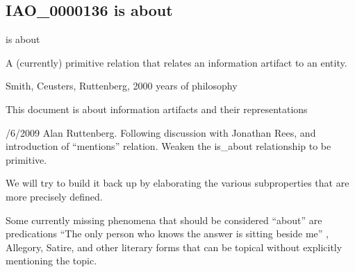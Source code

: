 \documentclass[letterpaper,10pt,english]{sphinxmanual}
\begin{document}
\subsection{IAO\_0000136 \sphinxhyphen{} is about}
\label{\detokenize{doc-IAO_0000136:iao-0000136-is-about}}\label{\detokenize{doc-IAO_0000136:index-0}}\label{\detokenize{doc-IAO_0000136::doc}}
\begin{sphinxShadowBox}

\sphinxAtStartPar
is about
\end{sphinxShadowBox}

\begin{sphinxShadowBox}

\sphinxAtStartPar
{}
\end{sphinxShadowBox}

\begin{sphinxShadowBox}

\sphinxAtStartPar
A (currently) primitive relation that relates an information artifact to an entity.
\end{sphinxShadowBox}

\begin{sphinxShadowBox}

\sphinxAtStartPar
Smith, Ceusters, Ruttenberg, 2000 years of philosophy
\end{sphinxShadowBox}

\begin{sphinxShadowBox}

\sphinxAtStartPar
This document is about information artifacts and their representations
\end{sphinxShadowBox}

\begin{sphinxShadowBox}

/6/2009 Alan Ruttenberg. Following discussion with Jonathan Rees, and introduction of “mentions” relation. Weaken the is\_about relationship to be primitive.

\sphinxAtStartPar
We will try to build it back up by elaborating the various subproperties that are more precisely defined.

\sphinxAtStartPar
Some currently missing phenomena that should be considered “about” are predications \sphinxhyphen{} “The only person who knows the answer is sitting beside me” , Allegory, Satire, and other literary forms that can be topical without explicitly mentioning the topic.
\end{sphinxShadowBox}
\end{document}
